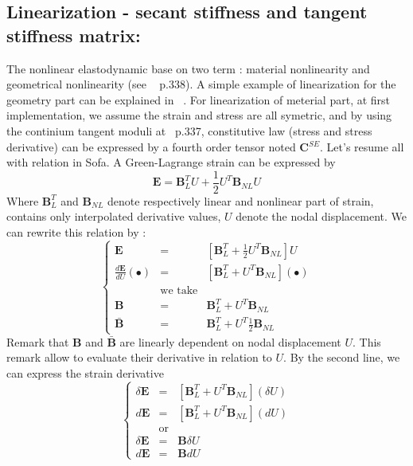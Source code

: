 \documentclass[a4paper,10pt]{article}
\begin{document}
\subsection{Linearization - secant stiffness and tangent stiffness matrix: }
The nonlinear elastodynamic base on two term : material nonlinearity and geometrical nonlinearity (see  ~\cite{FEMBook} p.338). A simple example of linearization for the geometry part can be explained in ~\cite{NonlinearGeo}. For linearization of meterial part, at first implementation, we assume the strain and stress are all symetric, and by using the continium tangent moduli at ~\cite{NonlinearGeo}p.337, constitutive law (stress and stress derivative) can be expressed by a fourth order tensor noted \textbf{C}$^{SE}$. Let's resume all with relation in Sofa. A Green-Lagrange strain can be expressed by  
\[
\textbf{E} = \textbf{B}^T_L U + \frac{1}{2} U^T \textbf{B}_{NL}  U             
\]
Where $\textbf{B}^T_L$ and $\textbf{B}_{NL}$ denote respectively linear and nonlinear part of strain, contains only interpolated derivative values, $U$ denote the nodal displacement. We can rewrite this relation by : 
\[
\left\{ 
\begin{array}{rcl}
\textbf{E}                      &=& [ \textbf{B}^T_L + \frac{1}{2} U^T \textbf{B}_{NL} ] U  \\  
\frac{d\textbf{E}}{dU}(\bullet) &=& [ \textbf{B}^T_L +  U^T \textbf{B}_{NL} ] (\bullet)     \\
            &\text{we take} &                                                               \\
      \textbf{B}   &=&  \textbf{B}^T_L +  U^T \textbf{B}_{NL}                               \\ 
 \bar{\textbf{B}}  &=&  \textbf{B}^T_L +  U^T \frac{1}{2}\textbf{B}_{NL}           
\end{array}\right.
\]
Remark that $\textbf{B}$ and $\bar{\textbf{B}}$ are linearly dependent on nodal displacement $U$. This remark allow to evaluate their derivative in relation to $U$. By the second line, we can express the strain derivative 
\[
\left\{ 
\begin{array}{rcl}
\delta \textbf{E}  &=& [ \textbf{B}^T_L +  U^T \textbf{B}_{NL} ] (\delta U)                 \\  
d \textbf{E}       &=& [ \textbf{B}^T_L +  U^T \textbf{B}_{NL} ] (dU)                       \\
            &\text{or} &                                                                    \\
\delta \textbf{E}  &=& \textbf{B} \delta U                                                  \\  
d \textbf{E}       &=& \textbf{B} dU                        
\end{array}\right.
\]
\end{document}
